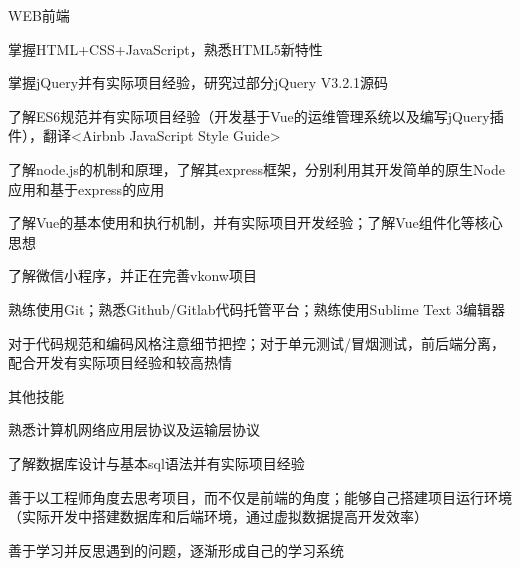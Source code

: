 \begin{cventries}
  \cventry
    {WEB前端}
    {}
    {}
    {}
    {
      \begin{cvitems}
        \item {掌握HTML+CSS+JavaScript，熟悉HTML5新特性}
        \item {掌握jQuery并有实际项目经验，研究过部分jQuery V3.2.1源码}
        \item {了解ES6规范并有实际项目经验（开发基于Vue的运维管理系统以及编写jQuery插件），翻译<Airbnb JavaScript Style Guide>}
        \item {了解node.js的机制和原理，了解其express框架，分别利用其开发简单的原生Node应用和基于express的应用}
        \item {了解Vue的基本使用和执行机制，并有实际项目开发经验；了解Vue组件化等核心思想}
        \item {了解微信小程序，并正在完善vkonw项目}
        \item {熟练使用Git；熟悉Github/Gitlab代码托管平台；熟练使用Sublime Text 3编辑器}
        \item {对于代码规范和编码风格注意细节把控；对于单元测试/冒烟测试，前后端分离，配合开发有实际项目经验和较高热情}
      \end{cvitems}
    }
  \cventry
    {其他技能}
    {}
    {}
    {}
    {
      \begin{cvitems}
        \item {熟悉计算机网络应用层协议及运输层协议}
        \item {了解数据库设计与基本sql语法并有实际项目经验}
        \item {善于以工程师角度去思考项目，而不仅是前端的角度；能够自己搭建项目运行环境（实际开发中搭建数据库和后端环境，通过虚拟数据提高开发效率）}
        \item {善于学习并反思遇到的问题，逐渐形成自己的学习系统}
      \end{cvitems}
    }
\end{cventries}
